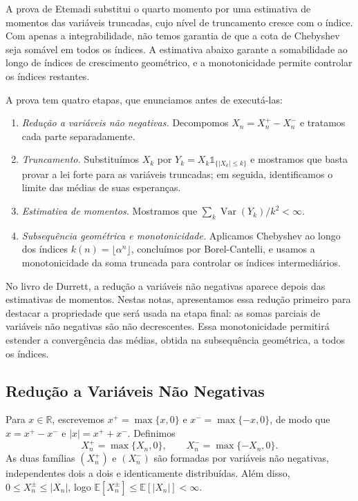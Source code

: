 \documentclass[12pt,portuguese]{article}
\theoremstyle{definition}
\theoremstyle{plainexercise}
\theoremstyle{starredexercise}
\theoremstyle{definition}
\begin{document}
\bigskip

A prova de Etemadi substitui o quarto momento por uma
estimativa de momentos das variáveis truncadas, cujo nível de truncamento
cresce com o índice. Com apenas a integrabilidade, não temos garantia de que a
cota de Chebyshev seja somável em todos os índices. A estimativa abaixo
garante a somabilidade ao longo de índices de crescimento geométrico, e a
monotonicidade permite controlar os índices restantes.

A prova tem quatro etapas, que enunciamos antes de executá-las:

\begin{enumerate}
\item[(i)] \emph{Redução a variáveis não negativas.} Decompomos
$X_n=X_n^+-X_n^-$ e tratamos cada parte separadamente.
\item[(ii)] \emph{Truncamento.} Substituímos $X_k$ por
$Y_k=X_k\mathds{1}_{\{|X_k|\leqslant k\}}$ e mostramos que basta provar a lei
forte para as variáveis truncadas; em seguida, identificamos o limite das
médias de suas esperanças.
\item[(iii)] \emph{Estimativa de momentos.} Mostramos que
$\sum_k\operatorname{Var}(Y_k)/k^2<\infty$.
\item[(iv)] \emph{Subsequência geométrica e monotonicidade.} Aplicamos
Chebyshev ao longo dos índices $k(n)=\lfloor\alpha^n\rfloor$, concluímos por
Borel-Cantelli, e usamos a monotonicidade da soma truncada para controlar os
índices intermediários.
\end{enumerate}

No livro de Durrett, a redução a variáveis não negativas aparece depois das
estimativas de momentos. Nestas notas, apresentamos essa redução primeiro
para destacar a propriedade que será usada na etapa final: as somas parciais
de variáveis não negativas são não decrescentes. Essa monotonicidade permitirá
estender a convergência das médias, obtida na subsequência geométrica,
a todos os índices.

\subsection{Redução a Variáveis Não Negativas}\label{subsec:reducao}

Para $x\in\mathbb{R}$, escrevemos $x^+=\max\{x,0\}$ e $x^-=\max\{-x,0\}$, de
modo que $x=x^+-x^-$ e $|x|=x^++x^-$. Definimos
\[
X_n^+=\max\{X_n,0\},
\qquad
X_n^-=\max\{-X_n,0\}.
\]
As duas famílias $(X_n^+)$ e $(X_n^-)$ são formadas por variáveis não
negativas, independentes dois a dois e identicamente distribuídas. Além disso,
$0\leqslant X_n^\pm\leqslant|X_n|$, logo
$\mathbb{E}[X_n^\pm]\leqslant\mathbb{E}[|X_n|]<\infty$.
\end{document}
